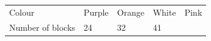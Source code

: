 \begin{enumerate}[noitemsep, label=\textbf{\arabic*}. ]
{{\begin{center}
\begin{xtabular}[t]{|l|l|l|l|l|}
    
        Colour &
    
    
        Purple &
    
    
        Orange &
    
    
        White &
    
    
        Pink%
     \tabularnewline{}
    
    
        Number of
blocks &
    
    
        24 &
    
    
        32 &
    
    
        41 &
    

\end{xtabular}
\end{center}}}
\end{enumerate}

